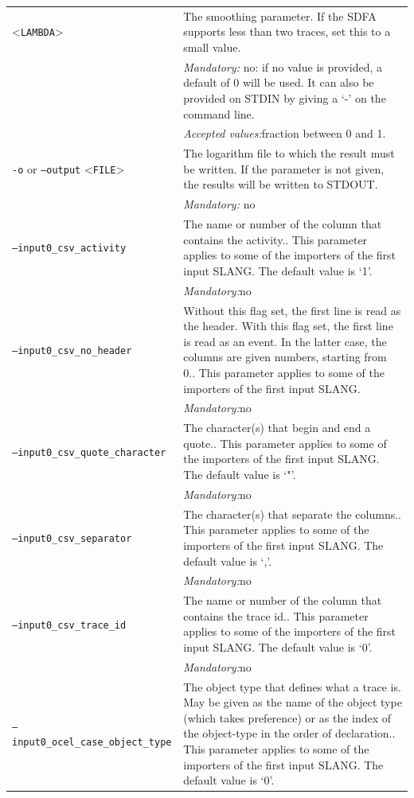 {\begin{tabularx}{\linewidth}{lX}
<\texttt{LAMBDA}>&The smoothing parameter. If the SDFA supports less than two traces, set this to a small value.\\
&\textit{Mandatory:} \quad no: if no value is provided, a default of 0 will be used. It can also be provided on STDIN by giving a `-' on the command line.\\
&\textit{Accepted values:}\quad fraction between 0 and 1.\\
\texttt{-o} or \texttt{--output} <\texttt{FILE}> &
The logarithm file to which the result must be written. If the parameter is not given, the results will be written to STDOUT.\\
&\textit{Mandatory:} \quad no\\
\texttt{--input0\_csv\_activity} & The name or number of the column that contains the activity.. This parameter applies to some of the importers of the first input SLANG. The default value is `1'.\\
&\textit{Mandatory:}\quad no\\
\texttt{--input0\_csv\_no\_header} & Without this flag set, the first line is read as the header. 
    With this flag set, the first line is read as an event. In the latter case, the columns are given numbers, starting from 0.. This parameter applies to some of the importers of the first input SLANG. \\
&\textit{Mandatory:}\quad no\\
\texttt{--input0\_csv\_quote\_character} & The character(s) that begin and end a quote.. This parameter applies to some of the importers of the first input SLANG. The default value is `"'.\\
&\textit{Mandatory:}\quad no\\
\texttt{--input0\_csv\_separator} & The character(s) that separate the columns.. This parameter applies to some of the importers of the first input SLANG. The default value is `,'.\\
&\textit{Mandatory:}\quad no\\
\texttt{--input0\_csv\_trace\_id} & The name or number of the column that contains the trace id.. This parameter applies to some of the importers of the first input SLANG. The default value is `0'.\\
&\textit{Mandatory:}\quad no\\
\texttt{--input0\_ocel\_case\_object\_type} & The object type that defines what a trace is. May be given as the name of the object type (which takes preference) or as the index of the object-type in the order of declaration.. This parameter applies to some of the importers of the first input SLANG. The default value is `0'.\\

\end{tabularx}}
